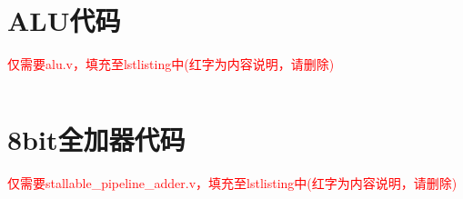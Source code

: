 \appendix
\section{ALU代码}
\textcolor{red}{仅需要alu.v，填充至lstlisting中(红字为内容说明，请删除)}
\begin{lstlisting}[language=Verilog]

\end{lstlisting}

\section{8bit全加器代码}
\textcolor{red}{仅需要stallable\_pipeline\_adder.v，填充至lstlisting中(红字为内容说明，请删除)}
\begin{lstlisting}[language=Verilog]

\end{lstlisting}

